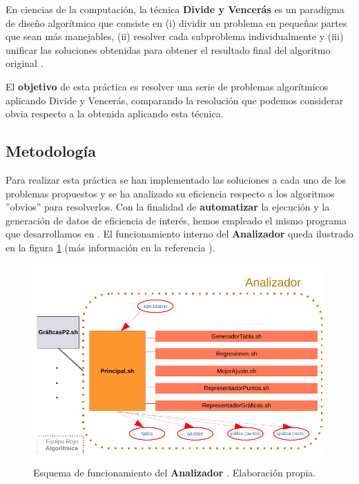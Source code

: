 En ciencias de la computación, la técnica \textbf{Divide y Vencerás} es un paradigma de diseño
algorítmico que consiste en (i) dividir un problema en pequeñas partes que sean más manejables,
(ii) resolver cada subproblema individualmente y (iii) unificar las soluciones obtenidas 
para obtener el resultado final del algoritmo original \cite{Cormen2017}. 

El \textbf{objetivo} de esta práctica es resolver una serie de problemas algorítmicos aplicando
Divide y Vencerás, comparando la resolución que podemos considerar obvia respecto a la obtenida 
aplicando esta técnica. 

\subsection{Metodología}

Para realizar esta práctica se han implementado las soluciones a cada uno de los problemas
propuestos y se ha analizado su eficiencia respecto a los algoritmos ''obvios'' para resolverlos.
Con la finalidad de \textbf{automatizar} la ejecución y la generación de datos de eficiencia
de interés, hemos empleado el mismo programa que desarrollamos en \cite{Rojo2022}.
El funcionamiento interno del \textbf{Analizador} queda ilustrado en la figura 
\ref{fig:analizador} (más información en la referencia \cite{Rojo2022}). 

\begin{figure}[h]
    \centering
    \includegraphics[scale=0.87]{img/esquema_graphkiller.pdf}
    \caption{Esquema de funcionamiento del \textbf{Analizador} \cite{Rojo2022}. Elaboración propia.}
    \label{fig:analizador}
\end{figure}


